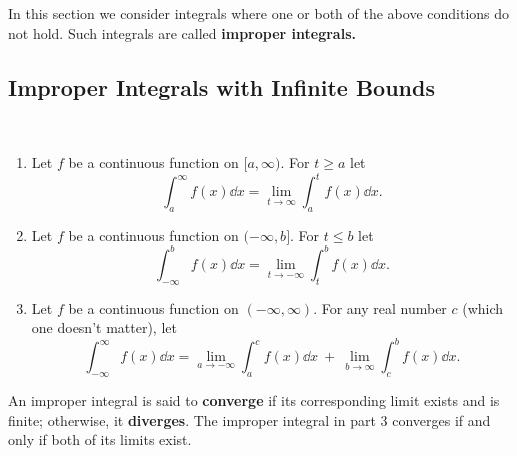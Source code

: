 In this section we consider integrals where one or both of the above conditions do not hold. Such integrals are called \textbf{improper integrals.}

\clearpage

\subsection{Improper Integrals with Infinite Bounds}

\begin{definition}\label{def:imp_int1}%
\mbox{}\\[-2\baselineskip]\parbox[t]{\linewidth}{%
\begin{enumerate}
\item		Let $f$ be a continuous function on $[a,\infty)$. For $t \geq a$ let
\[\int_a^\infty f(x)\dd x = \lim_{t\to\infty}\int_a^t f(x)\dd x.\]

\item		Let $f$ be a continuous function on $(-\infty,b]$. For $t \leq b$ let
\[\int_{-\infty}^b f(x)\dd x = \lim_{t\to-\infty}\int_t^b f(x)\dd x.\]

\item		Let $f$ be a continuous function on $(-\infty,\infty)$. For any real number $c$ (which one doesn't matter), let
\[
\int_{-\infty}^\infty f(x)\dd x
= \lim_{a\to-\infty}\int_a^c f(x)\dd x\ +\ \lim_{b\to\infty}\int_c^b f(x)\dd x.
\]
\end{enumerate}}
\end{definition}

An improper integral is said to \textbf{converge} if its corresponding limit exists and is finite; otherwise, it \textbf{diverges}. The improper integral in part 3 converges if and only if both of its limits exist.


